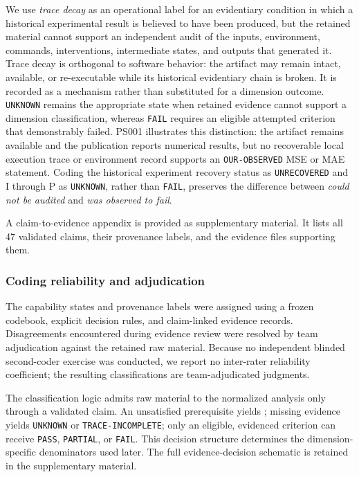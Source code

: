 \documentclass[a4paper,fleqn]{cas-dc}
\begin{document}
We use \emph{trace decay} as an operational label for an evidentiary condition in which a historical experimental result is believed to have been produced, but the retained material cannot support an independent audit of the inputs, environment, commands, interventions, intermediate states, and outputs that generated it. Trace decay is orthogonal to software behavior: the artifact may remain intact, available, or re-executable while its historical evidentiary chain is broken. It is recorded as a mechanism rather than substituted for a dimension outcome. \texttt{UNKNOWN} remains the appropriate state when retained evidence cannot support a dimension classification, whereas \texttt{FAIL} requires an eligible attempted criterion that demonstrably failed. PS001 illustrates this distinction: the artifact remains available and the publication reports numerical results, but no recoverable local execution trace or environment record supports an \texttt{OUR-OBSERVED} MSE or MAE statement. Coding the historical experiment recovery status as \texttt{UNRECOVERED} and I through P as \texttt{UNKNOWN}, rather than \texttt{FAIL}, preserves the difference between \emph{could not be audited} and \emph{was observed to fail}.

A claim-to-evidence appendix is provided as supplementary material. It lists all 47 validated claims, their provenance labels, and the evidence files supporting them.

\subsubsection{Coding reliability and adjudication}

The capability states and provenance labels were assigned using a frozen codebook, explicit decision rules, and claim-linked evidence records. Disagreements encountered during evidence review were resolved by team adjudication against the retained raw material. Because no independent blinded second-coder exercise was conducted, we report no inter-rater reliability coefficient; the resulting classifications are team-adjudicated judgments.

The classification logic admits raw material to the normalized analysis only through a validated claim. An unsatisfied prerequisite yields \protect{}; missing evidence yields \texttt{UNKNOWN} or \texttt{TRACE-INCOMPLETE}; only an eligible, evidenced criterion can receive \texttt{PASS}, \texttt{PARTIAL}, or \texttt{FAIL}. This decision structure determines the dimension-specific denominators used later. The full evidence-decision schematic is retained in the supplementary material.
\end{document}
